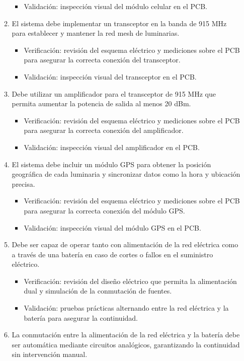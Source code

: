 \documentclass[
11pt, %
]{charter}
\begin{document}
\begin{enumerate}
\begin{enumerate}
\begin{itemize}
				\item Validación: inspección visual del módulo celular en el PCB.
				\end{itemize}
			\item El sistema debe implementar un transceptor en la banda de 915 MHz para establecer y mantener la red mesh de luminarias.
				\begin{itemize}
				\item Verificación: revisión del esquema eléctrico y mediciones sobre el PCB para asegurar la correcta conexión del transceptor. 
				\item Validación: inspección visual del transceptor en el PCB.
				\end{itemize}
			\item Debe utilizar un amplificador para el transceptor de 915 MHz que permita aumentar la potencia de salida al menos 20 dBm.
				\begin{itemize}
				\item Verificación: revisión del esquema eléctrico y mediciones sobre el PCB para asegurar la correcta conexión del amplificador. 
				\item Validación: inspección visual del amplificador en el PCB.
				\end{itemize}
\pagebreak
			\item El sistema debe incluir un módulo GPS para obtener la posición geográfica de cada luminaria y sincronizar datos como la hora y ubicación precisa.
				\begin{itemize}
				\item Verificación: revisión del esquema eléctrico y mediciones sobre el PCB para asegurar la correcta conexión del módulo GPS. 
				\item Validación: inspección visual del módulo GPS en el PCB.
				\end{itemize}
			\item Debe ser capaz de operar tanto con alimentación de la red eléctrica como a través de una batería en caso de cortes o fallos en el suministro eléctrico. 
				\begin{itemize}
				\item Verificación: revisión del diseño eléctrico que permita la alimentación dual y simulación de la conmutación de fuentes.
				\item Validación: pruebas prácticas alternando entre la red eléctrica y la batería para asegurar la continuidad.
				\end{itemize}
			\item La conmutación entre la alimentación de la red eléctrica y la batería debe ser automática mediante circuitos analógicos, garantizando la continuidad sin intervención manual.

\end{enumerate}
\end{enumerate}
\end{document}
